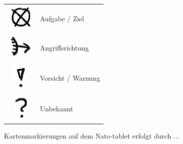 \begin{longtable}{p{3cm} p{15cm}}
	\includegraphics[scale=1]{./Grafiken/KarteUndMarkierungen/Aufgabe.png}		&		Aufgabe / Ziel \\
	\includegraphics[scale=1]{./Grafiken/KarteUndMarkierungen/Angriffsrichtung.png}	& 		Angriffsrichtung \\
	\includegraphics[scale=1]{./Grafiken/KarteUndMarkierungen/Achtung.png}		&		Vorsicht / Warnung \\
	\includegraphics[scale=1]{./Grafiken/KarteUndMarkierungen/FrageUnbekannt.png}	& 		Unbekannt \\
\end{longtable}

\newpage

	Kartenmarkierungen auf dem Nato-tablet erfolgt durch ...

